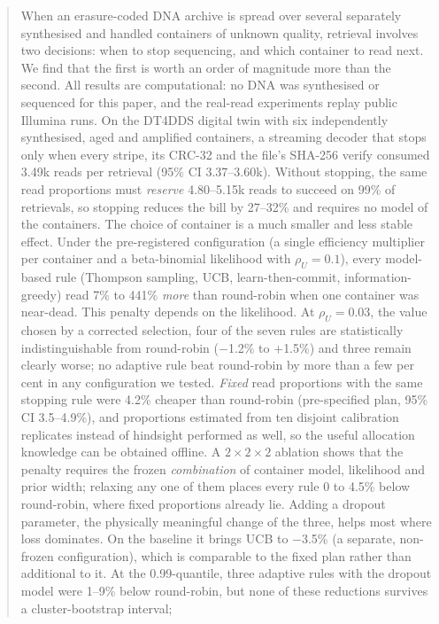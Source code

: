 \documentclass[conference,onecolumn,11pt]{IEEEtran}
\begin{document}
\begin{abstract}
When an erasure-coded DNA archive is spread over several separately synthesised and handled containers of
unknown quality, retrieval involves two decisions: when to stop sequencing, and which container to read
next.  We find that the first is worth an order of magnitude more than the second.  All results are
computational: no DNA was synthesised or sequenced for this paper, and the real-read experiments replay
public Illumina runs.  On the DT4DDS digital twin with six independently synthesised, aged and amplified
containers, a streaming decoder that stops only when every stripe, its CRC-32 and the file's SHA-256
verify consumed 3.49k reads per retrieval (95\% CI 3.37--3.60k).  Without stopping, the same read
proportions must \emph{reserve} 4.80--5.15k reads to succeed on 99\% of retrievals, so stopping reduces
the bill by 27--32\% and requires no model of the containers.  The choice of container is a much smaller
and less stable effect.  Under the pre-registered configuration (a single efficiency multiplier per
container and a beta-binomial likelihood with $\rho_U{=}0.1$), every model-based rule (Thompson sampling,
UCB, learn-then-commit, information-greedy) read 7\% to 441\% \emph{more} than round-robin when one
container was near-dead.  This penalty depends on the likelihood.  At $\rho_U{=}0.03$, the value chosen
by a corrected selection, four of the seven rules are statistically indistinguishable from round-robin
($-$1.2\% to $+$1.5\%) and three remain clearly worse; no adaptive rule beat round-robin by more than a
few per cent in any configuration we tested.  \emph{Fixed} read proportions with the same stopping rule
were 4.2\% cheaper than round-robin (pre-specified plan, 95\% CI 3.5--4.9\%), and proportions estimated
from ten disjoint calibration replicates instead of hindsight performed as well, so the useful
allocation knowledge can be obtained offline.  A $2\times2\times2$ ablation shows that the penalty
requires the frozen \emph{combination} of container model, likelihood and prior width; relaxing any one
of them places every rule 0 to 4.5\% below round-robin, where fixed proportions already lie.  Adding a
dropout parameter, the physically meaningful change of the three, helps most where loss dominates.  On
the baseline it brings UCB to $-$3.5\% (a separate, non-frozen configuration), which is comparable to the
fixed plan rather than additional to it.  At the 0.99-quantile, three adaptive rules with the dropout
model were 1--9\% below round-robin, but none of these reductions survives a cluster-bootstrap interval;

\end{abstract}
\end{document}
